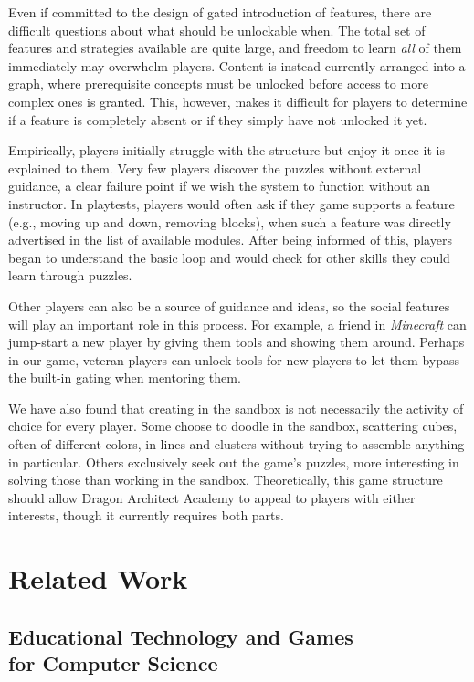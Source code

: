 \documentclass{sig-alternate}
\newcommand{\gametitle}{{\color{RoyalPurple} Dragon Architect Academy}}
\begin{document}
Even if committed to the design of gated introduction of features, there are difficult questions about what should be unlockable when.
The total set of features and strategies available are quite large, and freedom to learn \emph{all} of them immediately may overwhelm players.
Content is instead currently arranged into a graph, where prerequisite concepts must be unlocked before access to more complex ones is granted.
This, however, makes it difficult for players to determine if a feature is completely absent or if they simply have not unlocked it yet.

Empirically, players initially struggle with the structure but enjoy it once it is explained to them.
Very few players discover the puzzles without external guidance, a clear failure point if we wish the system to function without an instructor.
In playtests, players would often ask if they game supports a feature (e.g., moving up and down, removing blocks), when such a feature was directly advertised in the list of available modules.
After being informed of this, players began to understand the basic loop and would check for other skills they could learn through puzzles.

Other players can also be a source of guidance and ideas, so the social features will play an important role in this process.
For example, a friend in \emph{Minecraft} can jump-start a new player by giving them tools and showing them around.
Perhaps in our game, veteran players can unlock tools for new players to let them bypass the built-in gating when mentoring them.

We have also found that creating in the sandbox is not necessarily the activity of choice for every player. 
Some choose to doodle in the sandbox, scattering cubes, often of different colors, in lines and clusters without trying to assemble anything in particular.
Others exclusively seek out the game's puzzles, more interesting in solving those than working in the sandbox.
Theoretically, this game structure should allow \gametitle{} to appeal to players with either interests, though it currently requires both parts.

\section{Related Work}

\subsection{Educational Technology and Games\\for Computer Science}
\end{document}
